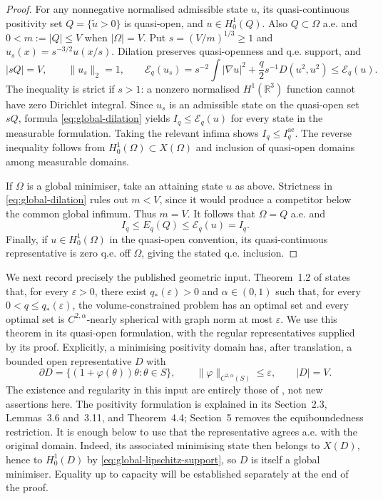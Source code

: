 \documentclass[11pt,a4paper]{article}
\theoremstyle{definition}
\theoremstyle{remark}
\begin{document}
\begin{proof}
For any nonnegative normalised admissible state $u$, its
quasi-continuous positivity set $Q=\{\widetilde u>0\}$ is quasi-open,
and $u\in H^1_0(Q)$.  Also $Q\subset\Omega$ a.e. and
$0<m:=|Q|\leq V$ when $|\Omega|=V$.  Put
$s=(V/m)^{1/3}\geq1$ and $u_s(x)=s^{-3/2}u(x/s)$.  Dilation
preserves quasi-openness and q.e. support, and
\begin{equation}
 |sQ|=V,\qquad \|u_s\|_2=1,\qquad
 \mathcal E_q(u_s)
 =s^{-2}\int|\nabla u|^2+\frac q2s^{-1}D(u^2,u^2)
 \leq\mathcal E_q(u).
 \label{eq:global-dilation}
\end{equation}
The inequality is strict if $s>1$: a nonzero normalised $H^1(\mathbb
R^3)$ function cannot have zero Dirichlet integral.  Since $u_s$ is an
admissible state on the quasi-open set $sQ$, formula
\eqref{eq:global-dilation} yields $I_q\leq\mathcal E_q(u)$ for every
state in the measurable formulation.  Taking the relevant infima
shows $I_q\leq I_q^{\mathrm{ae}}$.  The reverse inequality follows
from $H^1_0(\Omega)\subset X(\Omega)$ and inclusion of quasi-open
domains among measurable domains.

If $\Omega$ is a global minimiser, take an attaining state $u$ as above.
Strictness in \eqref{eq:global-dilation} rules out $m<V$, since it would
produce a competitor below the common global infimum.  Thus $m=V$.
It follows that $\Omega=Q$ a.e. and
\[
 I_q\leq E_q(Q)\leq\mathcal E_q(u)=I_q.
\]
Finally, if $u\in H^1_0(\Omega)$ in the quasi-open convention, its
quasi-continuous representative is zero q.e. off $\Omega$, giving the
stated q.e. inclusion.
\end{proof}

We next record precisely the published geometric input.
Theorem~1.2 of \cite[p.~1031]{MMR2025} states that, for every
$\varepsilon>0$, there exist $q_*(\varepsilon)>0$ and
$\alpha\in(0,1)$ such that, for every $0<q\leq q_*(\varepsilon)$,
the volume-constrained problem has an optimal set and every optimal
set is $C^{2,\alpha}$-nearly spherical with graph norm at most
$\varepsilon$.  We use this theorem in its quasi-open formulation,
with the regular representatives supplied by its proof.  Explicitly,
a minimising positivity domain has, after translation, a bounded open
representative $D$ with
\begin{equation}
 \partial D=\{(1+\varphi(\theta))\theta:\theta\in S\},
 \qquad
 \|\varphi\|_{C^{2,\alpha}(S)}\leq\varepsilon,
 \qquad |D|=V.
 \label{eq:global-source-graph}
\end{equation}
The existence and regularity in this input are entirely those of
\cite{MMR2025}, not new assertions here.  The positivity formulation is
explained in its Section~2.3, Lemmas~3.6 and~3.11, and Theorem~4.4;
Section~5 removes the equiboundedness restriction.  It is enough below
to use that the representative agrees a.e. with the original domain.
Indeed, its associated minimising state then belongs to $X(D)$, hence
to $H^1_0(D)$ by \eqref{eq:global-lipschitz-support}, so $D$ is itself
a global minimiser.  Equality up to capacity will be established
separately at the end of the proof.
\end{document}
